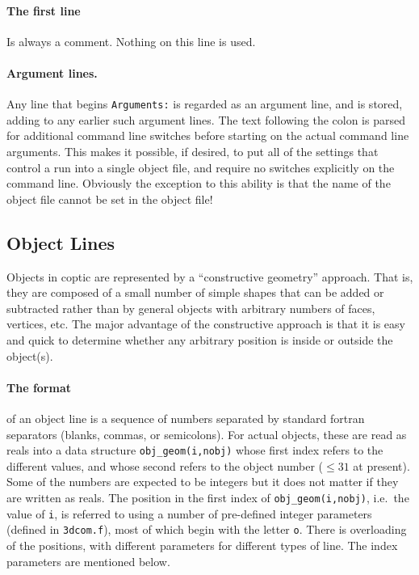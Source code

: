 \documentclass[12pt]{article}
\begin{document}
\paragraph{The first line} Is always a comment. Nothing on this line is used.

\paragraph{Argument lines.} Any line that begins \verb!Arguments:! is
regarded as an argument line, and is stored, adding to any earlier
such argument lines. The text following the colon is parsed for
additional command line switches before starting on the actual command
line arguments. This makes it possible, if desired, to put all of the
settings that control a run into a single object file, and require no
switches explicitly on the command line. Obviously the exception to
this ability is that the name of the object file cannot be set in the
object file!

\subsection{Object Lines}

Objects in coptic are represented by a ``constructive geometry''
approach. That is, they are composed of a small number of simple
shapes that can be added or subtracted rather than by general objects
with arbitrary numbers of faces, vertices, etc. The major advantage of
the constructive approach is that it is easy and quick to determine
whether any arbitrary position is inside or outside the object(s).

\paragraph{The format} of an object line is a sequence of numbers
separated by standard fortran separators (blanks, commas, or
semicolons). For actual objects, these are read as reals into a data
structure \verb!obj_geom(i,nobj)! whose first index refers to the
different values, and whose second refers to the object number
($\le31$ at present).  Some of the numbers are expected to be integers
but it does not matter if they are written as reals. The position in
the first index of \verb!obj_geom(i,nobj)!, i.e.\ the value of
\verb!i!, is referred to using a number of pre-defined integer
parameters (defined in \verb!3dcom.f!), most of which begin with the
letter \verb!o!. There is overloading of the positions, with different
parameters for different types of line. The index parameters are
mentioned below.
\end{document}
